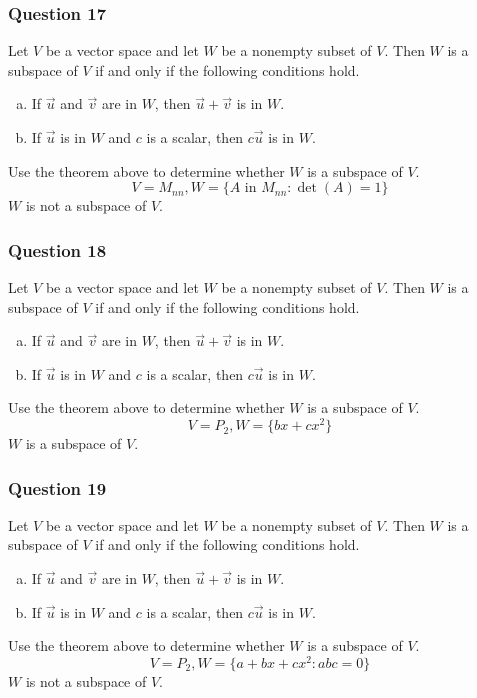 \documentclass{math}
\begin{document}
\subsubsection*{Question 17}
Let \( V \) be a vector space and let \( W \) be a nonempty subset of \( V \).
Then \( W \) is a subspace of \( V \) if and only if the following conditions
hold.
\begin{enumerate}[(a)]
  \item If \( \vec{u} \) and \( \vec{v} \) are in \( W \), then \( \vec{u}+
    \vec{v} \) is in \( W \).
  \item If \( \vec{u} \) is in \( W \) and \( c \) is a scalar, then
    \( c\vec{u} \) is in \( W \).
\end{enumerate}
Use the theorem above to determine whether \( W \) is a subspace of \( V \).
\[ V = M_{nn}, W = \{A\text{ in }M_{nn}: \det(A) = 1\} \]
\( W \) is not a subspace of \( V \).

\subsubsection*{Question 18}
Let \( V \) be a vector space and let \( W \) be a nonempty subset of \( V \).
Then \( W \) is a subspace of \( V \) if and only if the following conditions
hold.
\begin{enumerate}[(a)]
  \item If \( \vec{u} \) and \( \vec{v} \) are in \( W \), then \( \vec{u}+
    \vec{v} \) is in \( W \).
  \item If \( \vec{u} \) is in \( W \) and \( c \) is a scalar, then
    \( c\vec{u} \) is in \( W \).
\end{enumerate}
Use the theorem above to determine whether \( W \) is a subspace of \( V \).
\[ V = P_2, W = \{bx+cx^2\} \]
\( W \) is a subspace of \( V \).

\subsubsection*{Question 19}
Let \( V \) be a vector space and let \( W \) be a nonempty subset of \( V \).
Then \( W \) is a subspace of \( V \) if and only if the following conditions
hold.
\begin{enumerate}[(a)]
  \item If \( \vec{u} \) and \( \vec{v} \) are in \( W \), then \( \vec{u}+
    \vec{v} \) is in \( W \).
  \item If \( \vec{u} \) is in \( W \) and \( c \) is a scalar, then
    \( c\vec{u} \) is in \( W \).
\end{enumerate}
Use the theorem above to determine whether \( W \) is a subspace of \( V \).
\[ V = P_2, W = \{a+bx+cx^2: abc = 0\} \]
\( W \) is not a subspace of \( V \).
\end{document}
